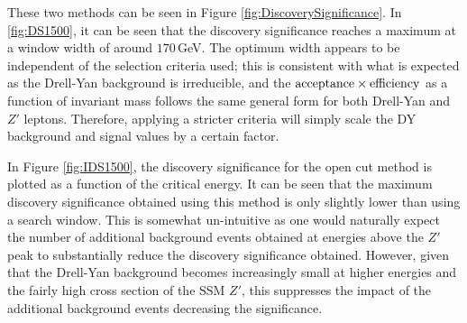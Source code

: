 \documentclass{article}
\begin{document}
These two methods can be seen in Figure \ref{fig:DiscoverySignificance}. In \ref{fig:DS1500}, it can be seen that the discovery significance reaches a maximum at a window width of around $170\,$GeV. The optimum width appears to be independent of the selection criteria used; this is consistent with what is expected as the Drell-Yan background is irreducible, and the $\rm{acceptance}\times\rm{efficiency}$ as a function of invariant mass follows the same general form for both Drell-Yan and $Z'$ leptons. Therefore, applying a stricter criteria will simply scale the DY background  and signal values by a certain factor. 


In Figure \ref{fig:IDS1500}, the discovery significance for the open cut method is plotted as a function of the critical energy. It can be seen that the maximum discovery significance obtained using this method is only slightly lower than using a search window. This is somewhat un-intuitive as one would naturally expect the number of additional background events obtained at energies above the $Z'$ peak to substantially reduce the discovery significance obtained. However, given that the Drell-Yan background becomes increasingly small at higher energies and the fairly high cross section of the SSM $Z'$, this suppresses the impact of the additional background events decreasing the significance.
\end{document}
